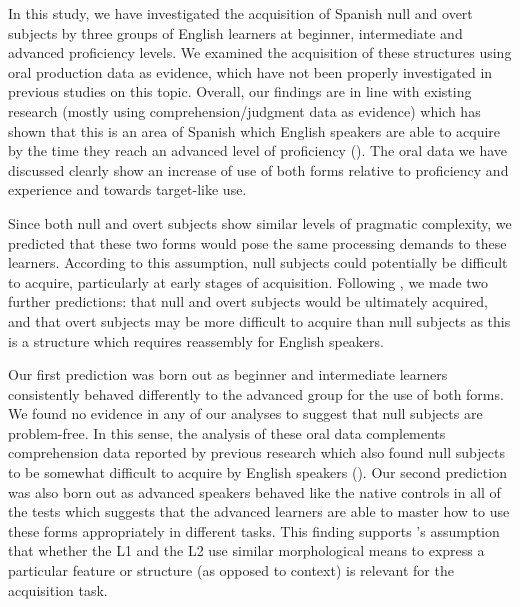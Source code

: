 \documentclass[output=paper]{langscibook}
\begin{document}
In this study, we have investigated the acquisition of Spanish null and overt subjects by three groups of English learners at beginner, intermediate and advanced proficiency levels. We examined the acquisition of these structures using oral production data as evidence, which have not been properly investigated in previous studies on this topic. Overall, our findings are in line with existing research (mostly using comprehension/judgment data as evidence) which has shown that this is an area of Spanish which English speakers are able to acquire by the time they reach an advanced level of proficiency (\citealt{Perez-LerouxGlass1999,LicerasDíaz1999,Lozano2002,Lozano2006,Hertel2003,Montrul2004, MontrulRodríguezLouro2006, BellettiEtAl2007,RothmanIverson2007,Dominguez2013, Pladevall2013}). The oral data we have discussed clearly show an increase of use of both forms relative to proficiency and experience and towards target-like use.

Since both null and overt subjects show similar levels of pragmatic complexity, we predicted that these two forms would pose the same processing demands to these learners. According to this assumption, null subjects could potentially be difficult to acquire, particularly at early stages of acquisition. Following \citet{ChoSlabakova2014}, we made two further predictions: that null and overt subjects would be ultimately acquired, and that overt subjects may be more difficult to acquire than null subjects as this is a structure which requires reassembly for English speakers.

Our first prediction was born out as beginner and intermediate learners consistently behaved differently to the advanced group for the use of both forms. We found no evidence in any of our analyses to suggest that null subjects are problem-free. In this sense, the analysis of these oral data complements comprehension data reported by previous research which also found null subjects to be somewhat difficult to acquire by English speakers (\citealt{MontrulRodríguezLouro2006,Dominguez2013, Pladevall2013,ClementsDomínguez2017}). Our second prediction was also born out as advanced speakers behaved like the native controls in all of the tests which suggests that the advanced learners are able to master how to use these forms appropriately in different tasks. This finding supports \citet{ChoSlabakova2014}'s assumption that whether the L1 and the L2 use similar morphological means to express a particular feature or structure (as opposed to context) is relevant for the acquisition task.
\end{document}
